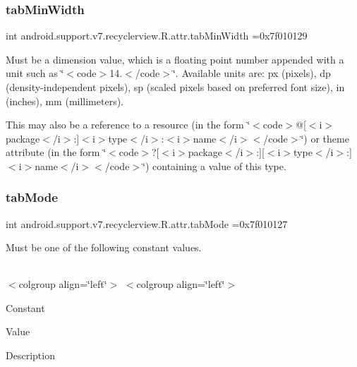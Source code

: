 \subsubsection{\texorpdfstring{tab\+Min\+Width}{tabMinWidth}}
{\footnotesize\ttfamily int android.\+support.\+v7.\+recyclerview.\+R.\+attr.\+tab\+Min\+Width =0x7f010129\hspace{0.3cm}{\ttfamily [static]}}

Must be a dimension value, which is a floating point number appended with a unit such as \char`\"{}$<$code$>$14.\+5sp$<$/code$>$\char`\"{}. Available units are\+: px (pixels), dp (density-\/independent pixels), sp (scaled pixels based on preferred font size), in (inches), mm (millimeters). 

This may also be a reference to a resource (in the form \char`\"{}$<$code$>$@\mbox{[}$<$i$>$package$<$/i$>$\+:\mbox{]}$<$i$>$type$<$/i$>$\+:$<$i$>$name$<$/i$>$$<$/code$>$\char`\"{}) or theme attribute (in the form \char`\"{}$<$code$>$?\mbox{[}$<$i$>$package$<$/i$>$\+:\mbox{]}\mbox{[}$<$i$>$type$<$/i$>$\+:\mbox{]}$<$i$>$name$<$/i$>$$<$/code$>$\char`\"{}) containing a value of this type. \mbox{\label{classandroid_1_1support_1_1v7_1_1recyclerview_1_1R_1_1attr_a2c5653fba1bebf0aa1815e8de00d03f7}} 
\subsubsection{\texorpdfstring{tab\+Mode}{tabMode}}
{\footnotesize\ttfamily int android.\+support.\+v7.\+recyclerview.\+R.\+attr.\+tab\+Mode =0x7f010127\hspace{0.3cm}{\ttfamily [static]}}

Must be one of the following constant values.

\tabulinesep=1mm
\begin{longtabu} spread 0pt [c]{*{0}{|X[-1]}|}
\hline
\end{longtabu}
$<$colgroup align=\char`\"{}left\char`\"{}$>$ $<$colgroup align=\char`\"{}left\char`\"{}$>$ 

Constant

Value

Description 

